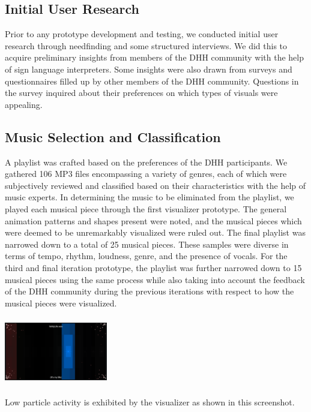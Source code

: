 \documentclass{sigchi-ext}
\begin{document}
\subsection{Initial User Research}
Prior to any prototype development and testing, we conducted initial user research through needfinding and some structured interviews. We did this to acquire preliminary insights from members of the DHH community with the help of sign language interpreters. Some insights were also drawn from surveys and questionnaires filled up by other members of the DHH community.  Questions in the survey inquired about their preferences on which types of visuals were appealing.


\subsection{Music Selection and Classification}
A playlist was crafted based on the preferences of the DHH participants. We gathered 106 MP3 files encompassing a variety of genres, each of which were subjectively reviewed and classified based on their characteristics with the help of music experts. In determining the music to be eliminated from the playlist, we played each musical piece through the first visualizer prototype. The general animation patterns and shapes present were noted, and the musical pieces which were deemed to be unremarkably visualized were ruled out. The final playlist was narrowed down to a total of 25 musical pieces. These samples were diverse in terms of tempo, rhythm, loudness, genre, and the presence of vocals. For the third and final iteration prototype, the playlist was further narrowed down to 15 musical pieces using the same process while also taking into account the feedback of the DHH community during the previous iterations with respect to how the musical pieces were visualized.




\begin{marginfigure}[0pc]
\begin{minipage}{\marginparwidth}
     \includegraphics[width=4.5cm,height=3cm]{figures/LowParticleActivity.png}
    \caption{Low particle activity is exhibited by the visualizer as shown in this screenshot.}
    \label{fig:lowparticle}
    \end{minipage}
\end{marginfigure}
\end{document}
